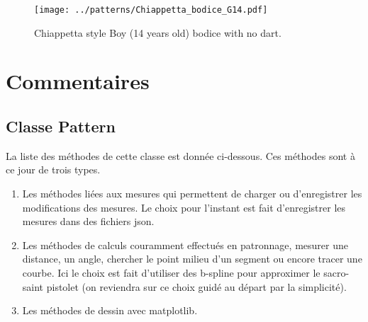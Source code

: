 \documentclass[11pt,a4paper]{report}
\begin{document}
\begin{figure}[hbtp]
\centering
\texttt{[image: ../patterns/Chiappetta\_bodice\_G14.pdf]}
\caption{Chiappetta style Boy (14 years old) bodice with no dart.}
\label{fig:CB14}
\end{figure}




\chapter{Commentaires}


\section{Classe Pattern}
La liste des méthodes de cette classe est donnée ci-dessous. Ces méthodes sont à ce jour de trois types.

\begin{enumerate}
\item Les méthodes liées aux mesures qui permettent de charger ou d'enregistrer les modifications des mesures. Le choix pour l'instant est fait d'enregistrer les mesures dans des fichiers json.
\item Les méthodes de calculs couramment effectués en patronnage, mesurer une distance, un angle, chercher le point milieu d'un segment ou encore tracer une courbe. Ici le choix est fait d'utiliser des b-spline pour approximer le sacro-saint pistolet (on reviendra sur ce choix guidé au départ par la simplicité).
\item Les méthodes de dessin avec matplotlib.
\end{enumerate}
\end{document}
